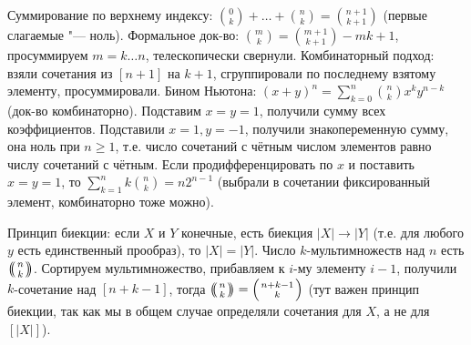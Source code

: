 Суммирование по верхнему индексу: $\binom{0}{k}+\dots+\binom{n}{k}=\binom{n+1}{k+1}$ (первые слагаемые "--- ноль).
Формальное док-во: $\binom{m}{k}=\binom{m+1}{k+1}-{m}{k+1}$, просуммируем $m=k\dots n$, телескопически свернули.
Комбинаторный подход: взяли сочетания из $[n+1]$ на $k+1$, сгруппировали по последнему взятому элементу, просуммировали.
Бином Ньютона: $(x+y)^n=\sum_{k=0}^n \binom{n}{k}x^ky^{n-k}$ (док-во комбинаторно).
Подставим $x=y=1$, получили сумму всех коэффициентов.
Подставили $x=1, y=-1$, получили знакопеременную сумму, она ноль при $n\ge 1$,
т.е. число сочетаний с чётным числом элементов равно числу сочетаний с чётным.
Если продифференцировать по $x$ и поставить $x=y=1$, то $\sum_{k=1}^n k\binom{n}{k} = n2^{n-1}$ (выбрали в сочетании фиксированный элемент, комбинаторно тоже можно).

Принцип биекции: если $X$ и $Y$ конечные, есть биекция $|X|\to|Y|$ (т.е. для любого $y$ есть единственный прообраз), то $|X|=|Y|$.
Число $k$-мультимножеств над $n$ есть $\repbinom{n}{k}$.
Сортируем мультимножество, прибавляем к $i$-му элементу $i-1$, получили $k$-сочетание над $[n+k-1]$,
тогда $\repbinom{n}{k}=\binom{n+k-1}{k}$ (тут важен принцип биекции, так как мы в общем случае определяли сочетания для $X$, а не для $[|X|]$).

\section{} %

\section{} %

